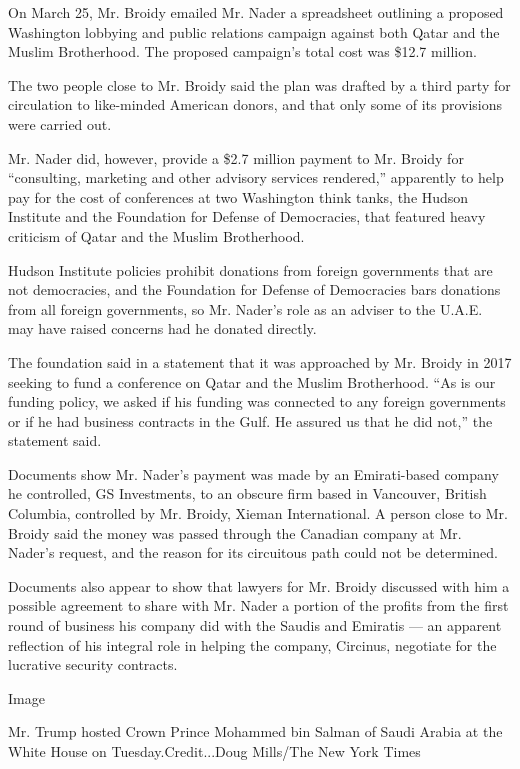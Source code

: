 On March 25, Mr. Broidy emailed Mr. Nader a spreadsheet outlining a
proposed Washington lobbying and public relations campaign against both
Qatar and the Muslim Brotherhood. The proposed campaign's total cost was
\$12.7 million.

The two people close to Mr. Broidy said the plan was drafted by a third
party for circulation to like-minded American donors, and that only some
of its provisions were carried out.

Mr. Nader did, however, provide a \$2.7 million payment to Mr. Broidy
for ``consulting, marketing and other advisory services rendered,''
apparently to help pay for the cost of conferences at two Washington
think tanks, the Hudson Institute and the Foundation for Defense of
Democracies, that featured heavy criticism of Qatar and the Muslim
Brotherhood.

Hudson Institute policies prohibit donations from foreign governments
that are not democracies, and the Foundation for Defense of Democracies
bars donations from all foreign governments, so Mr. Nader's role as an
adviser to the U.A.E. may have raised concerns had he donated directly.

The foundation said in a statement that it was approached by Mr. Broidy
in 2017 seeking to fund a conference on Qatar and the Muslim
Brotherhood. ``As is our funding policy, we asked if his funding was
connected to any foreign governments or if he had business contracts in
the Gulf. He assured us that he did not,'' the statement said.

Documents show Mr. Nader's payment was made by an Emirati-based company
he controlled, GS Investments, to an obscure firm based in Vancouver,
British Columbia, controlled by Mr. Broidy, Xieman International. A
person close to Mr. Broidy said the money was passed through the
Canadian company at Mr. Nader's request, and the reason for its
circuitous path could not be determined.

Documents also appear to show that lawyers for Mr. Broidy discussed with
him a possible agreement to share with Mr. Nader a portion of the
profits from the first round of business his company did with the Saudis
and Emiratis --- an apparent reflection of his integral role in helping
the company, Circinus, negotiate for the lucrative security contracts.

Image

Mr. Trump hosted Crown Prince Mohammed bin Salman of Saudi Arabia at the
White House on Tuesday.Credit...Doug Mills/The New York Times

